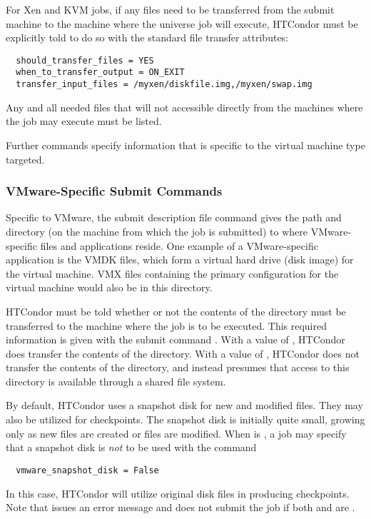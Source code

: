 For Xen and KVM jobs, if any files need to be transferred from the submit machine
to the machine where the  universe job will execute, 
HTCondor must be explicitly told to do so with the 
standard file transfer attributes:
\footnotesize
\begin{verbatim}
  should_transfer_files = YES
  when_to_transfer_output = ON_EXIT
  transfer_input_files = /myxen/diskfile.img,/myxen/swap.img
\end{verbatim}
\normalsize
Any and all needed files that will not accessible directly
from the machines where the job may execute must be listed.

Further commands specify information that is specific to the
virtual machine type targeted.

\subsubsection{\label{sec:vm-VMwaresubmitfile}VMware-Specific Submit Commands}

Specific to VMware, the submit description file command
 gives the path and directory
(on the machine from which the job is submitted)
to where VMware-specific files and applications reside.
One example of a VMware-specific application is the VMDK files,
which form a virtual hard drive (disk image) for the virtual machine.
VMX files containing the primary configuration for the virtual
machine would also be in this directory.

HTCondor must be told whether or not the contents of the 
directory must be transferred to the machine where the job is
to be executed.
This required information is given with the submit command
.
With a value of ,
HTCondor does transfer the contents of the directory.
With a value of ,
HTCondor does not transfer the contents of the directory,
and instead presumes that access to this directory is
available through a shared file system.

By default, HTCondor uses a snapshot disk for new and modified files.
They may also be utilized for checkpoints.
The snapshot disk is initially quite small,
growing only as new files are created or files are modified.
When  is ,
a job may specify that a snapshot disk is \emph{not} to be
used with the command
\begin{verbatim}
  vmware_snapshot_disk = False
\end{verbatim}
In this case, HTCondor will utilize original disk files in producing
checkpoints. 
Note that  issues an error message and does not
submit the job if both 
and  are .

